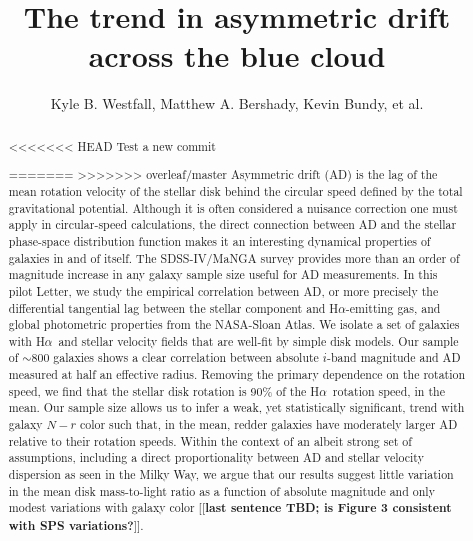 \documentclass[apj,iop,revtex4,numberedappendix]{emulateapj}
\newcommand{\comment}[2][todo]{{\color{#1}[[{\bf #2}]]}}
\newcommand{\halpha}{H$\alpha$}
\begin{document}
\title{ The trend in asymmetric drift across the blue cloud }

\author{ Kyle B. Westfall, Matthew A.
Bershady, Kevin Bundy, et al. }




\begin{abstract}

<<<<<<< HEAD
Test a new commit

=======
>>>>>>> overleaf/master
Asymmetric drift (AD) is the lag of the mean rotation velocity of the
stellar disk behind the circular speed defined by the total
gravitational potential.  Although it is often considered a nuisance
correction one must apply in circular-speed calculations, the direct
connection between AD and the stellar phase-space distribution function
makes it an interesting dynamical properties of galaxies in and of
itself.  The SDSS-IV/MaNGA survey provides more than an order of
magnitude increase in any galaxy sample size useful for AD measurements.
In this pilot Letter, we study the empirical correlation between AD, or
more precisely the differential tangential lag between the stellar
component and \halpha-emitting gas, and global photometric properties
from the NASA-Sloan Atlas.  We isolate a set of galaxies with \halpha\
and stellar velocity fields that are well-fit by simple disk models.
Our sample of $\sim$800 galaxies shows a clear correlation between
absolute $i$-band magnitude and AD measured at half an effective radius.
Removing the primary dependence on the rotation speed, we find that the
stellar disk rotation is 90\% of the \halpha\ rotation speed, in the
mean.  Our sample size allows us to infer a weak, yet statistically
significant, trend with galaxy $N-r$ color such that, in the mean,
redder galaxies have moderately larger AD relative to their rotation
speeds.  Within the context of an albeit strong set of assumptions,
including a direct proportionality between AD and stellar velocity
dispersion as seen in the Milky Way, we argue that our results suggest
little variation in the mean disk mass-to-light ratio as a function of
absolute magnitude and only modest variations with galaxy color
\comment{last sentence TBD; is Figure 3 consistent with SPS
variations?}.

\end{abstract}
\end{document}
